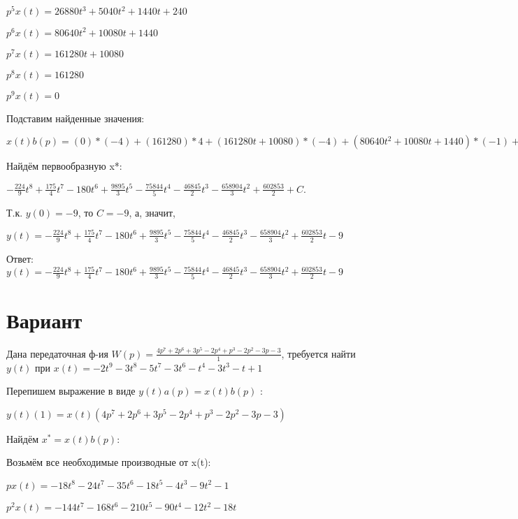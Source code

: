 \documentclass{article}
\begin{document}
{{{{{$p^5x(t)=26880t^{3}+5040t^{2}+1440t+240$

$p^6x(t)=80640t^{2}+10080t+1440$

$p^7x(t)=161280t+10080$

$p^8x(t)=161280$

$p^9x(t)=0$

Подставим найденные значения:

$x(t)b(p) = (0)*(-4)+(161280)*4+(161280t+10080)*(-4)+(80640t^{2}+10080t+1440)*(-1)+(26880t^{3}+5040t^{2}+1440t+240)*(-3)+(6720t^{4}+1680t^{3}+720t^{2}+240t+72)*3+(1344t^{5}+420t^{4}+240t^{3}+120t^{2}+72t+12)*(-1)+(224t^{6}+84t^{5}+60t^{4}+40t^{3}+36t^{2}+12t+8)*2+(32t^{7}+14t^{6}+12t^{5}+10t^{4}+12t^{3}+6t^{2}+8t+1)*(-2)+(32t^{7}+14t^{6}+12t^{5}+10t^{4}+12t^{3}+6t^{2}+8t+1)*(-5)=-224t^{7}+350t^{6}-1260t^{5}+19790t^{4}-75844t^{3}-93690t^{2}-658904t$





Найдём первообразную x*:

$-\frac{224}{9}t^{8}+\frac{175}{4}t^{7}-180t^{6}+\frac{9895}{3}t^{5}-\frac{75844}{5}t^{4}-\frac{46845}{2}t^{3}-\frac{658904}{3}t^{2}+\frac{602853}{2}+C.$

Т.к. $y(0)=-9$, то $C=-9$, а, значит, 

$y(t)=-\frac{224}{9}t^{8}+\frac{175}{4}t^{7}-180t^{6}+\frac{9895}{3}t^{5}-\frac{75844}{5}t^{4}-\frac{46845}{2}t^{3}-\frac{658904}{3}t^{2}+\frac{602853}{2}t-9$

Ответ: $y(t) = -\frac{224}{9}t^{8}+\frac{175}{4}t^{7}-180t^{6}+\frac{9895}{3}t^{5}-\frac{75844}{5}t^{4}-\frac{46845}{2}t^{3}-\frac{658904}{3}t^{2}+\frac{602853}{2}t-9$

\section{Вариант}

Дана передаточная ф-ия $W(p)=\frac{4p^{7}+2p^{6}+3p^{5}-2p^{4}+p^{3}-2p^{2}-3p-3}{1}$, требуется найти $y(t)$ при $x(t)=-2t^{9}-3t^{8}-5t^{7}-3t^{6}-t^{4}-3t^{3}-t+1$

Перепишем выражение в виде $y(t)a(p)=x(t)b(p)$ :

$y(t)(1)=x(t)(4p^{7}+2p^{6}+3p^{5}-2p^{4}+p^{3}-2p^{2}-3p-3)$

Найдём $x^*=x(t)b(p)$:

Возьмём все необходимые производные от x(t):

$px(t)=-18t^{8}-24t^{7}-35t^{6}-18t^{5}-4t^{3}-9t^{2}-1$

$p^2x(t)=-144t^{7}-168t^{6}-210t^{5}-90t^{4}-12t^{2}-18t$

}}}}}
\end{document}
